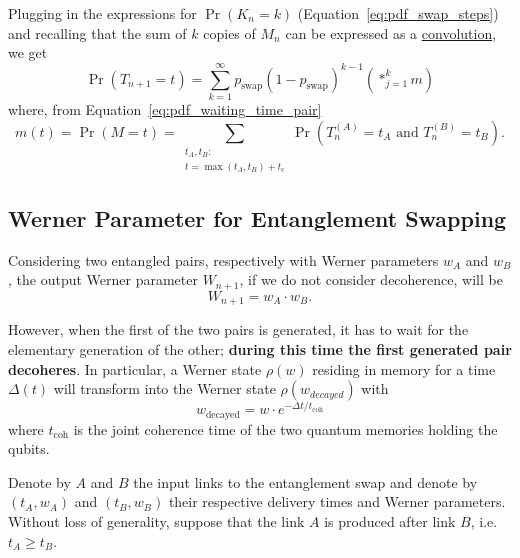 \documentclass{masterthesis}
\begin{document}
Plugging in the expressions for $\Pr(K_n = k)$ (Equation~\ref{eq:pdf_swap_steps}) and recalling that the sum of $k$ copies of $M_n$ can be expressed as a \hyperref[eq:convolution]{convolution}, we get
\begin{equation}\label{eq:waiting_time_swap}
    \Pr(T_{n+1} = t) = \sum_{k=1}^{\infty} p_{\text{swap}}{(1 - p_{\text{swap}})}^{k-1} \left( \ast_{j=1}^{k} m \right)
\end{equation}
where, from Equation~\ref{eq:pdf_waiting_time_pair}
\begin{equation}\label{eq:pdf_waiting_time_pair_convolution}
    m(t) = \Pr(M = t) = \sum_{\substack{t_A, t_B: \\ t = \max(t_A, t_B) + t_c}} \Pr(T_n^{(A)} = t_A \text{ and } T_n^{(B)} = t_B) .
\end{equation}

\subsection{Werner Parameter for Entanglement Swapping}

Considering two entangled pairs, respectively with Werner parameters $w_A$ and $w_B$, the output Werner parameter $W_{n+1}$, if we do not consider decoherence, will be %
\begin{equation}
    W_{n+1} = w_A \cdot w_B .
\end{equation}

However, when the first of the two pairs is generated, it has to wait for the elementary generation of the other; \textbf{during this time the first generated pair decoheres}. In particular, a Werner state $\rho(w)$ residing in memory for a time $\Delta(t)$ will transform into the Werner state $\rho(w_{decayed})$ with 
\begin{equation}\label{eq:w_decayed}
    w_{\text{decayed}} = w \cdot e^{-\Delta t / t_\text{coh}}
\end{equation}
where $t_\text{coh}$ is the joint coherence time of the two quantum memories holding the qubits. %

Denote by $A$ and $B$ the input links to the entanglement swap and denote by $\left(t_{A}, w_{A}\right)$ and $\left(t_{B}, w_{B}\right)$ their respective delivery times and Werner parameters. 
Without loss of generality, suppose that the link $A$ is produced after link $B$, i.e.\ $t_{A} \geq t_{B}$. 
\end{document}
